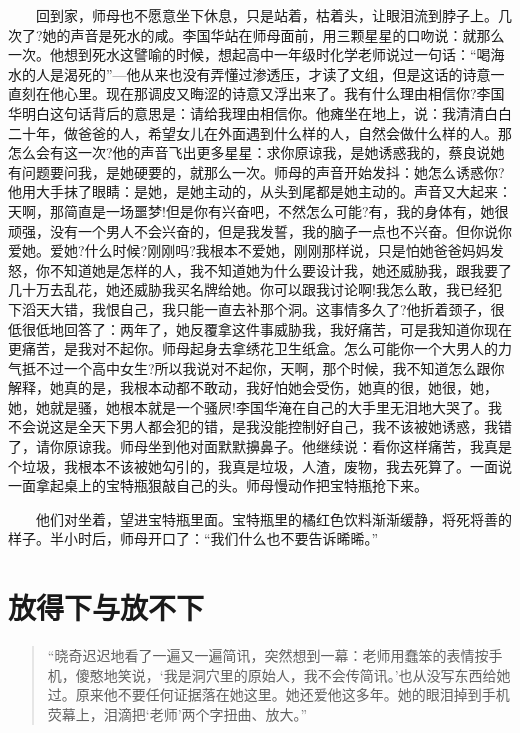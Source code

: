 \documentclass[12pt,UTF8]{ctexbook}
\begin{document}
　　回到家，师母也不愿意坐下休息，只是站着，枯着头，让眼泪流到脖子上。几次了?她的声音是死水的咸。李国华站在师母面前，用三颗星星的口吻说：就那么一次。他想到死水这譬喻的时候，想起高中一年级时化学老师说过一句话：\enquote{喝海水的人是渴死的}---他从来也没有弄懂过渗透压，才读了文组，但是这话的诗意一直刻在他心里。现在那调皮又晦涩的诗意又浮出来了。我有什么理由相信你?李国华明白这句话背后的意思是：请给我理由相信你。他瘫坐在地上，说：我清清白白二十年，做爸爸的人，希望女儿在外面遇到什么样的人，自然会做什么样的人。那怎么会有这一次?他的声音飞出更多星星：求你原谅我，是她诱惑我的，蔡良说她有问题要问我，是她硬要的，就那么一次。师母的声音开始发抖：她怎么诱惑你?他用大手抹了眼睛：是她，是她主动的，从头到尾都是她主动的。声音又大起来：天啊，那简直是一场噩梦!但是你有兴奋吧，不然怎么可能?有，我的身体有，她很顽强，没有一个男人不会兴奋的，但是我发誓，我的脑子一点也不兴奋。但你说你爱她。爱她?什么时候?刚刚吗?我根本不爱她，刚刚那样说，只是怕她爸爸妈妈发怒，你不知道她是怎样的人，我不知道她为什么要设计我，她还威胁我，跟我要了几十万去乱花，她还威胁我买名牌给她。你可以跟我讨论啊!我怎么敢，我已经犯下滔天大错，我恨自己，我只能一直去补那个洞。这事情多久了?他折着颈子，很低很低地回答了：两年了，她反覆拿这件事威胁我，我好痛苦，可是我知道你现在更痛苦，是我对不起你。师母起身去拿绣花卫生纸盒。怎么可能你一个大男人的力气抵不过一个高中女生?所以我说对不起你，天啊，那个时候，我不知道怎么跟你解释，她真的是，我根本动都不敢动，我好怕她会受伤，她真的很，她很，她，她，她就是骚，她根本就是一个骚屄!李国华淹在自己的大手里无泪地大哭了。我不会说这是全天下男人都会犯的错，是我没能控制好自己，我不该被她诱惑，我错了，请你原谅我。师母坐到他对面默默擤鼻子。他继续说：看你这样痛苦，我真是个垃圾，我根本不该被她勾引的，我真是垃圾，人渣，废物，我去死算了。一面说一面拿起桌上的宝特瓶狠敲自己的头。师母慢动作把宝特瓶抢下来。

　　他们对坐着，望进宝特瓶里面。宝特瓶里的橘红色饮料渐渐缓静，将死将善的样子。半小时后，师母开口了：\enquote{我们什么也不要告诉晞晞。}

\hypertarget{ux653eux5f97ux4e0bux4e0eux653eux4e0dux4e0b}{%
\section*{放得下与放不下}\label{ux653eux5f97ux4e0bux4e0eux653eux4e0dux4e0b}}

\begin{quote}
\enquote{晓奇迟迟地看了一遍又一遍简讯，突然想到一幕：老师用蠢笨的表情按手机，傻憨地笑说，\enquote{我是洞穴里的原始人，我不会传简讯。}也从没写东西给她过。原来他不要任何证据落在她这里。她还爱他这多年。她的眼泪掉到手机荧幕上，泪滴把\enquote{老师}两个字扭曲、放大。}
\end{quote}
\end{document}
